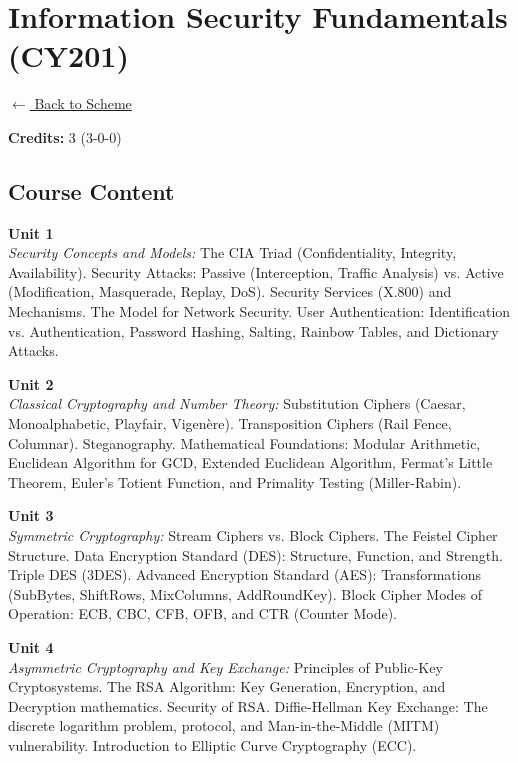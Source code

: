 \section*{Information Security Fundamentals (CY201)}
\label{major:CS_1}

\noindent \small{\hyperref[main:scheme]{$\leftarrow$ Back to Scheme}} \vspace{0.5cm}

\noindent \textbf{Credits:} 3 (3-0-0)

\subsection*{Course Content}
\noindent\textbf{Unit 1} \\
\textit{Security Concepts and Models:} The CIA Triad (Confidentiality, Integrity, Availability). Security Attacks: Passive (Interception, Traffic Analysis) vs. Active (Modification, Masquerade, Replay, DoS). Security Services (X.800) and Mechanisms. The Model for Network Security. User Authentication: Identification vs. Authentication, Password Hashing, Salting, Rainbow Tables, and Dictionary Attacks.

\vspace{0.3cm}

\noindent\textbf{Unit 2} \\
\textit{Classical Cryptography and Number Theory:} Substitution Ciphers (Caesar, Monoalphabetic, Playfair, Vigenère). Transposition Ciphers (Rail Fence, Columnar). Steganography. Mathematical Foundations: Modular Arithmetic, Euclidean Algorithm for GCD, Extended Euclidean Algorithm, Fermat's Little Theorem, Euler's Totient Function, and Primality Testing (Miller-Rabin).

\vspace{0.3cm}

\noindent\textbf{Unit 3} \\
\textit{Symmetric Cryptography:} Stream Ciphers vs. Block Ciphers. The Feistel Cipher Structure. Data Encryption Standard (DES): Structure, Function, and Strength. Triple DES (3DES). Advanced Encryption Standard (AES): Transformations (SubBytes, ShiftRows, MixColumns, AddRoundKey). Block Cipher Modes of Operation: ECB, CBC, CFB, OFB, and CTR (Counter Mode).

\vspace{0.3cm}

\noindent\textbf{Unit 4} \\
\textit{Asymmetric Cryptography and Key Exchange:} Principles of Public-Key Cryptosystems. The RSA Algorithm: Key Generation, Encryption, and Decryption mathematics. Security of RSA. Diffie-Hellman Key Exchange: The discrete logarithm problem, protocol, and Man-in-the-Middle (MITM) vulnerability. Introduction to Elliptic Curve Cryptography (ECC).

